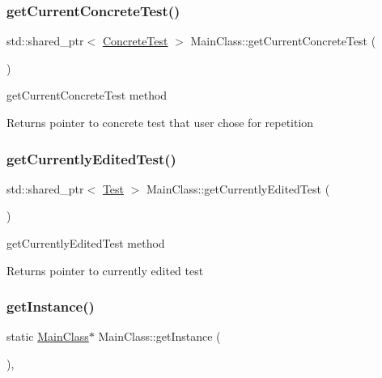 \subsubsection{\texorpdfstring{get\+Current\+Concrete\+Test()}{getCurrentConcreteTest()}}
{\footnotesize\ttfamily std\+::shared\+\_\+ptr$<$ \hyperlink{class_concrete_test}{Concrete\+Test} $>$ Main\+Class\+::get\+Current\+Concrete\+Test (\begin{DoxyParamCaption}{ }\end{DoxyParamCaption})}



get\+Current\+Concrete\+Test method 

\begin{DoxyReturn}{Returns}
pointer to concrete test that user chose for repetition 
\end{DoxyReturn}
\mbox{\label{class_main_class_a8733164fc7f8305dc6c717a07bd8dc85}} 
\subsubsection{\texorpdfstring{get\+Currently\+Edited\+Test()}{getCurrentlyEditedTest()}}
{\footnotesize\ttfamily std\+::shared\+\_\+ptr$<$ \hyperlink{class_test}{Test} $>$ Main\+Class\+::get\+Currently\+Edited\+Test (\begin{DoxyParamCaption}{ }\end{DoxyParamCaption})}



get\+Currently\+Edited\+Test method 

\begin{DoxyReturn}{Returns}
pointer to currently edited test 
\end{DoxyReturn}
\mbox{\label{class_main_class_a9b4a4cac62c4e8613b9ec63d6686eb8c}} 
\subsubsection{\texorpdfstring{get\+Instance()}{getInstance()}}
{\footnotesize\ttfamily static \hyperlink{class_main_class}{Main\+Class}$\ast$ Main\+Class\+::get\+Instance (\begin{DoxyParamCaption}{ }\end{DoxyParamCaption})\hspace{0.3cm}{\ttfamily [inline]}, {\ttfamily [static]}}



